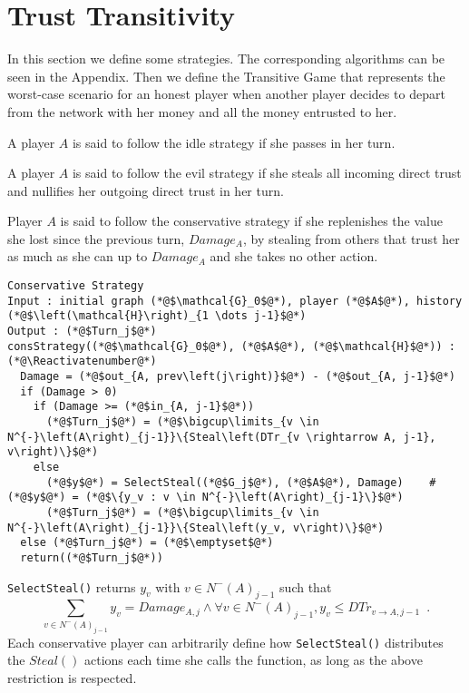 \documentclass[11pt]{llncs}
\makeatletter
\newcommand*\Suppressnumber{%
  \lst@AddToHook{OnNewLine}{%
    \let\thelstnumber\relax%
     \advance\c@lstnumber-\@ne\relax%
    }%
}
\theoremstyle{definition}
\makeatother
\begin{document}
  \section{Trust Transitivity}
     In this section we define some strategies. The corresponding algorithms can be seen in the Appendix. Then we define the
     Transitive Game that represents the worst-case scenario for an honest player when another player decides to depart from
     the network with her money and all the money entrusted to her.
     \begin{definition}
        A player $A$ is said to follow the idle strategy if she passes in her turn. 
     \end{definition}
     \begin{definition}
        A player $A$ is said to follow the evil strategy if she steals all incoming direct trust and nullifies her outgoing
        direct trust in her turn.
     \end{definition}
     \begin{definition}
        Player $A$ is said to follow the conservative strategy if she replenishes the value she lost since the previous turn,
        $Damage_A$, by stealing from others that trust her as much as she can up to $Damage_A$ and she takes no other action.
     \end{definition}

     \Suppressnumber
     \begin{lstlisting}[label=conservativestrategy, style=numbers]
Conservative Strategy
Input : initial graph (*@$\mathcal{G}_0$@*), player (*@$A$@*), history (*@$\left(\mathcal{H}\right)_{1 \dots j-1}$@*)
Output : (*@$Turn_j$@*)
consStrategy((*@$\mathcal{G}_0$@*), (*@$A$@*), (*@$\mathcal{H}$@*)) : (*@\Reactivatenumber@*)
  Damage = (*@$out_{A, prev\left(j\right)}$@*) - (*@$out_{A, j-1}$@*)
  if (Damage > 0)
    if (Damage >= (*@$in_{A, j-1}$@*))
      (*@$Turn_j$@*) = (*@$\bigcup\limits_{v \in N^{-}\left(A\right)_{j-1}}\{Steal\left(DTr_{v \rightarrow A, j-1}, v\right)\}$@*)
    else
      (*@$y$@*) = SelectSteal((*@$G_j$@*), (*@$A$@*), Damage)    #(*@$y$@*) = (*@$\{y_v : v \in N^{-}\left(A\right)_{j-1}\}$@*)
      (*@$Turn_j$@*) = (*@$\bigcup\limits_{v \in N^{-}\left(A\right)_{j-1}}\{Steal\left(y_v, v\right)\}$@*)
  else (*@$Turn_j$@*) = (*@$\emptyset$@*)
  return((*@$Turn_j$@*))
     \end{lstlisting}
     \texttt{SelectSteal()} returns $y_v$ with $v \in N^{-}\left(A\right)_{j-1}$ such that
     \begin{equation*}
        \sum\limits_{v \in N^{-}\left(A\right)_{j-1}}y_v = Damage_{A, j} \wedge \forall v \in N^{-}\left(A\right)_{j-1},
        y_v \leq DTr_{v \rightarrow A, j-1} \enspace.
     \end{equation*}
     Each conservative player can arbitrarily define how \texttt{SelectSteal()} distributes the $Steal\left(\right)$ actions
     each time she calls the function, as long as the above restriction is respected. 
\end{document}

